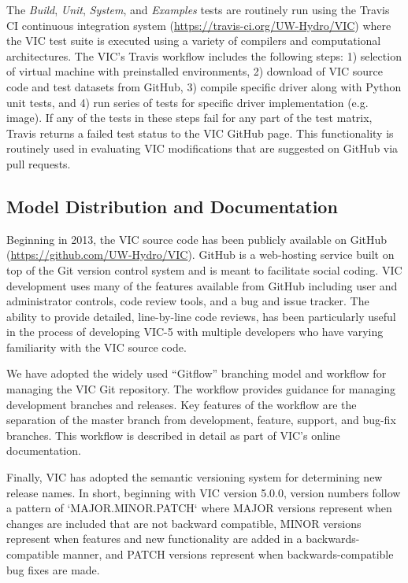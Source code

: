 \documentclass[gmd, manuscript]{copernicus}
\begin{document}
    The \textit{Build}, \textit{Unit}, \textit{System}, and \textit{Examples} tests are routinely run using the Travis CI continuous integration system (\url{https://travis-ci.org/UW-Hydro/VIC}) where the VIC test suite is executed using a variety of compilers and computational architectures. The VIC's Travis workflow includes the following steps: 1) selection of virtual machine with preinstalled environments, 2) download of VIC source code and test datasets from GitHub, 3) compile specific driver along with Python unit tests, and 4) run series of tests for specific driver implementation (e.g. image). If any of the tests in these steps fail for any part of the test matrix, Travis returns a failed test status to the VIC GitHub page. This functionality is routinely used in evaluating VIC modifications that are suggested on GitHub via pull requests.

  \subsection{Model Distribution and Documentation}

    Beginning in 2013, the VIC source code has been publicly available on GitHub (\url{https://github.com/UW-Hydro/VIC}). GitHub is a web-hosting service built on top of the Git version control system and is meant to facilitate social coding. VIC development uses many of the features available from GitHub including user and administrator controls, code review tools, and a bug and issue tracker. The ability to provide detailed, line-by-line code reviews, has been particularly useful in the process of developing VIC-5 with multiple developers who have varying familiarity with the VIC source code.

    We have adopted the widely used ``Gitflow'' branching model and workflow for managing the VIC Git repository. The workflow provides guidance for managing development branches and releases. Key features of the workflow are the separation of the master branch from development, feature, support, and bug-fix branches. This workflow is described in detail as part of VIC's online documentation.

    Finally, VIC has adopted the semantic versioning system \citep{Preston-Werner_2018} for determining new release names. In short, beginning with VIC version 5.0.0, version numbers follow a pattern of `MAJOR.MINOR.PATCH` where MAJOR versions represent when changes are included that are not backward compatible, MINOR versions represent when features and new functionality are added in a backwards-compatible manner, and PATCH versions represent when backwards-compatible bug fixes are made.
\end{document}
